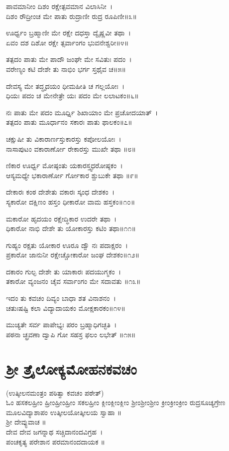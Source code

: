 ಪಾವಮಾನೀಂ ದಿಶಂ ರಕ್ಷೇತ್ಪವಮಾನ ವಿಲಾಸಿನೀ~।\\
ದಿಶಂ ರೌದ್ರೀಂಚ ಮೇ ಪಾತು ರುದ್ರಾಣೀ ರುದ್ರ ರೂಪಿಣೀ॥೩॥

ಊರ್ಧ್ವಂ ಬ್ರಹ್ಮಾಣೀ ಮೇ ರಕ್ಷೇ ದಧಸ್ತಾ ದ್ವೈಷ್ಣವೀ ತಥಾ~।\\
ಏವಂ ದಶ ದಿಶೋ ರಕ್ಷೇ ತ್ಸರ್ವಾಂಗಂ ಭುವನೇಶ್ವರೀ॥೪॥

ತತ್ಪದಂ ಪಾತು ಮೇ ಪಾದೌ ಜಂಘೇ ಮೇ ಸವಿತುಃ ಪದಂ~।\\
ವರೇಣ್ಯಂ ಕಟಿ ದೇಶೇ ತು ನಾಭಿಂ ಭರ್ಗ ಸ್ತಥೈವ ಚ॥೫॥

ದೇವಸ್ಯ ಮೇ ತದ್ಧೃದಯಂ ಧೀಮಹೀತಿ ಚ ಗಲ್ಲಯೋಃ~।\\
ಧಿಯಃ ಪದಂ ಚ ಮೇನೇತ್ರೇ ಯಃ ಪದಂ ಮೇ ಲಲಾಟಕಂ॥೬॥

ನಃ ಪಾತು ಮೇ ಪದಂ ಮೂರ್ಧ್ನಿ ಶಿಖಾಯಾಂ ಮೇ ಪ್ರಚೋದಯಾತ್~।\\
ತತ್ಪದಂ ಪಾತು ಮೂರ್ಧಾನಂ ಸಕಾರಃ ಪಾತು ಫಾಲಕಂ॥೭॥

ಚಕ್ಷುಷೀ ತು ವಿಕಾರಾರ್ಣಸ್ತುಕಾರಸ್ತು ಕಪೋಲಯೋಃ~।\\
ನಾಸಾಪುಟಂ ವಕಾರಾರ್ಣೋ ರೇಕಾರಸ್ತು ಮುಖೇ ತಥಾ ॥೮॥

ಣಿಕಾರ ಊರ್ಧ್ವ ಮೋಷ್ಠಂತು ಯಕಾರಸ್ತ್ವಧರೋಷ್ಠಕಂ~।\\
ಆಸ್ಯಮಧ್ಯೇ ಭಕಾರಾರ್ಣೋ ರ್ಗೋಕಾರ ಶ್ಚುಬುಕೇ ತಥಾ ॥೯॥

ದೇಕಾರಃ ಕಂಠ ದೇಶೇತು ವಕಾರಃ ಸ್ಕಂಧ ದೇಶಕಂ~।\\
ಸ್ಯಕಾರೋ ದಕ್ಷಿಣಂ ಹಸ್ತಂ ಧೀಕಾರೋ ವಾಮ ಹಸ್ತಕಂ॥೧೦॥

ಮಕಾರೋ ಹೃದಯಂ ರಕ್ಷೇದ್ಧಿಕಾರ ಉದರೇ ತಥಾ~।\\
ಧಿಕಾರೋ ನಾಭಿ ದೇಶೇ ತು ಯೋಕಾರಸ್ತು ಕಟಿಂ ತಥಾ॥೧೧॥

ಗುಹ್ಯಂ ರಕ್ಷತು ಯೋಕಾರ ಊರೂ ದ್ವೌ ನಃ ಪದಾಕ್ಷರಂ~।\\
ಪ್ರಕಾರೋ ಜಾನುನೀ ರಕ್ಷೇಚ್ಚೋಕಾರೋ ಜಂಘ ದೇಶಕಂ॥೧೨॥

ದಕಾರಂ ಗುಲ್ಫ ದೇಶೇ ತು ಯಾಕಾರಃ ಪದಯುಗ್ಮಕಂ~।\\
ತಕಾರೋ ವ್ಯಂಜನಂ ಚೈವ ಸರ್ವಾಂಗಂ ಮೇ ಸದಾವತು ॥೧೩॥

ಇದಂ ತು ಕವಚಂ ದಿವ್ಯಂ ಬಾಧಾ ಶತ ವಿನಾಶನಂ~।\\
ಚತುಃಷಷ್ಟಿ ಕಲಾ ವಿದ್ಯಾದಾಯಕಂ ಮೋಕ್ಷಕಾರಕಂ॥೧೪॥

ಮುಚ್ಯತೇ ಸರ್ವ ಪಾಪೇಭ್ಯಃ ಪರಂ ಬ್ರಹ್ಮಾಧಿಗಚ್ಛತಿ~।\\
ಪಠನಾ ಚ್ಛ್ರವಣಾ ದ್ವಾಪಿ ಗೋ ಸಹಸ್ರ ಫಲಂ ಲಭೇತ್ ॥೧೫॥
\section{ಶ್ರೀ ತ್ರೈಲೋಕ್ಯಮೋಹನಕವಚಂ }
(ಉತ್ಕೀಲನಮಂತ್ರಂ ಪಠಿತ್ವಾ ಕವಚಂ ಪಠೇತ್)\\
ಓಂ ಹಸಕಲಹ್ರೀಂ ಹ್ರೀಂಹ್ರೀಂಹ್ರೀಂ ಸಕಲಹ್ರೀಂ ಕ್ಲೀಂಕ್ಲೀಂಕ್ಲೀಂ  ಶ್ರೀಂಶ್ರೀಂಶ್ರೀಂ ಕ್ರೀಂಕ್ರೀಂಕ್ರೀಂ ರುದ್ರಸೂಚ್ಯಗ್ರೇಣ ಮೂಲವಿದ್ಯಾಶಾಪಂ ಉತ್ಕೀಲಯೋತ್ಕೀಲಯ ಸ್ವಾಹಾ ॥\\
ಶ್ರೀ ದೇವ್ಯುವಾಚ ॥\\
ದೇವ ದೇವ ಜಗನ್ನಾಥ ಸಚ್ಚಿದಾನಂದವಿಗ್ರಹ~।\\
ಪಂಚಕೃತ್ಯ ಪರೇಶಾನ ಪರಮಾನಂದದಾಯಕ ॥

